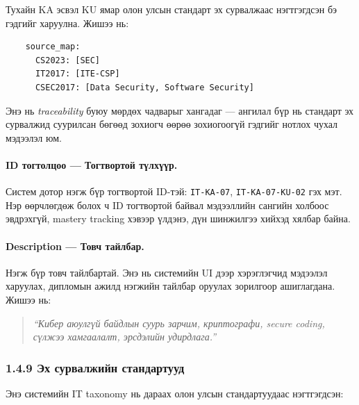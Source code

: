 \documentclass[12pt,A4]{report}
\newcommand{\eng}[1]{#1}
\newcommand{\term}[1]{\textit{#1}}
\begin{document}
Тухайн KA эсвэл KU ямар олон улсын стандарт эх сурвалжаас нэгтгэгдсэн бэ гэдгийг харуулна. Жишээ нь:

\begin{verbatim}
    source_map:
      CS2023: [SEC]
      IT2017: [ITE-CSP]
      CSEC2017: [Data Security, Software Security]
\end{verbatim}

Энэ нь \term{\eng{traceability}} буюу мөрдөх чадварыг хангадаг --- ангилал бүр нь стандарт эх сурвалжид суурилсан бөгөөд зохиогч өөрөө зохиогоогүй гэдгийг нотлох чухал мэдээлэл юм. 

\paragraph{\eng{ID} тогтолцоо --- Тогтвортой түлхүүр.}

Систем дотор нэгж бүр тогтвортой ID-тэй: \texttt{IT-KA-07}, \texttt{IT-KA-07-KU-02} гэх мэт. Нэр өөрчлөгдөж болох ч ID тогтвортой байвал мэдээллийн сангийн холбоос эвдрэхгүй, \eng{mastery tracking} хэвээр үлдэнэ, дүн шинжилгээ хийхэд хялбар байна.

\paragraph{\eng{Description} --- Товч тайлбар.}

Нэгж бүр товч тайлбартай. Энэ нь системийн UI дээр хэрэглэгчид мэдээлэл харуулах, дипломын ажилд нэгжийн тайлбар оруулах зорилгоор ашиглагдана. Жишээ нь:

\begin{quote}
\textit{``Кибер аюулгүй байдлын суурь зарчим, криптографи, secure coding, сүлжээ хамгаалалт, эрсдэлийн удирдлага.''}
\end{quote}

\subsubsection{1.4.9 Эх сурвалжийн стандартууд}

Энэ системийн IT \eng{taxonomy} нь дараах олон улсын стандартуудаас нэгтгэгдсэн:
\end{document}
